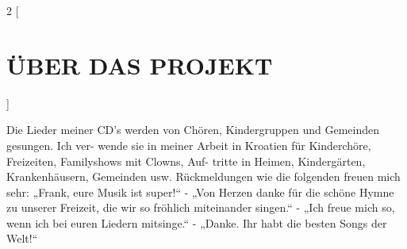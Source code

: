\documentclass[a4paper,twoside, svgnames]{article}
\begin{document}
\newpage
\begin{multicols}{2}
[
\section*{ÜBER DAS PROJEKT}
]
    \begin{onehalfspacing}
        \begin{justify}
Die Lieder meiner CD’s werden von Chören, Kindergruppen und Gemeinden gesungen. Ich ver-
wende sie in meiner Arbeit in Kroatien für Kinderchöre, Freizeiten, Familyshows mit Clowns, Auf-
tritte in Heimen, Kindergärten, Krankenhäusern, Gemeinden usw.
Rückmeldungen wie die folgenden freuen mich sehr:
„Frank, eure Musik ist super!“ - „Von Herzen danke für die schöne Hymne zu unserer Freizeit, die
wir so fröhlich miteinander singen.“ - „Ich freue mich so, wenn ich bei euren Liedern mitsinge.“ -
„Danke. Ihr habt die besten Songs der Welt!“


\end{justify}
\end{onehalfspacing}
\end{multicols}
\end{document}
